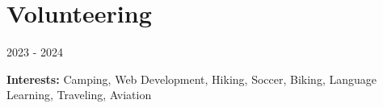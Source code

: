 \documentclass{resume}
\begin{document}
  
\section{Volunteering}

  
\resumeEntryStart
    \resumeEntryTD
      {\engcrediblevolunteer}{2023 - 2024}
    \resumeItemListStart
    \resumeItemListEnd
  \resumeEntryEnd
  
\resumeEntryStart
  \item[]{\hspace{-10pt}}\small{
    \textbf{\color{primary}Interests: }{Camping, Web Development, Hiking, Soccer, Biking, Language Learning, Traveling, Aviation \vspace{-8pt}}
  }
  \resumeEntryEnd
\end{document}

